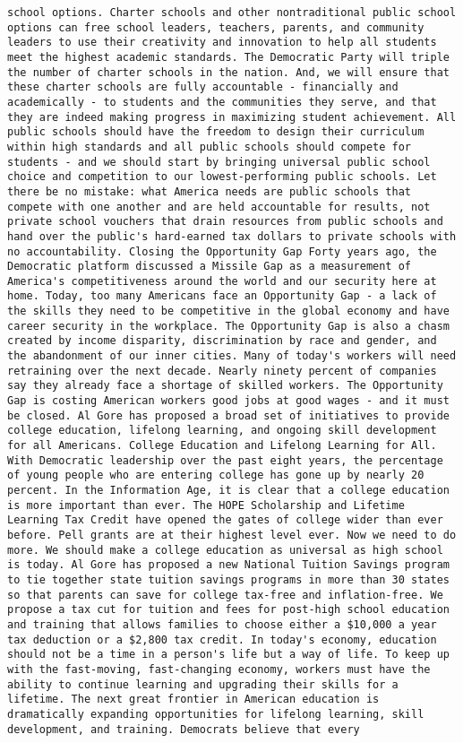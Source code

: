 \documentclass[
]{article}
\begin{document}
\begin{verbatim}
school options. Charter schools and other nontraditional public school options can free school leaders, teachers, parents, and community leaders to use their creativity and innovation to help all students meet the highest academic standards. The Democratic Party will triple the number of charter schools in the nation. And, we will ensure that these charter schools are fully accountable - financially and academically - to students and the communities they serve, and that they are indeed making progress in maximizing student achievement. All public schools should have the freedom to design their curriculum within high standards and all public schools should compete for students - and we should start by bringing universal public school choice and competition to our lowest-performing public schools. Let there be no mistake: what America needs are public schools that compete with one another and are held accountable for results, not private school vouchers that drain resources from public schools and hand over the public's hard-earned tax dollars to private schools with no accountability. Closing the Opportunity Gap Forty years ago, the Democratic platform discussed a Missile Gap as a measurement of America's competitiveness around the world and our security here at home. Today, too many Americans face an Opportunity Gap - a lack of the skills they need to be competitive in the global economy and have career security in the workplace. The Opportunity Gap is also a chasm created by income disparity, discrimination by race and gender, and the abandonment of our inner cities. Many of today's workers will need retraining over the next decade. Nearly ninety percent of companies say they already face a shortage of skilled workers. The Opportunity Gap is costing American workers good jobs at good wages - and it must be closed. Al Gore has proposed a broad set of initiatives to provide college education, lifelong learning, and ongoing skill development for all Americans. College Education and Lifelong Learning for All. With Democratic leadership over the past eight years, the percentage of young people who are entering college has gone up by nearly 20 percent. In the Information Age, it is clear that a college education is more important than ever. The HOPE Scholarship and Lifetime Learning Tax Credit have opened the gates of college wider than ever before. Pell grants are at their highest level ever. Now we need to do more. We should make a college education as universal as high school is today. Al Gore has proposed a new National Tuition Savings program to tie together state tuition savings programs in more than 30 states so that parents can save for college tax-free and inflation-free. We propose a tax cut for tuition and fees for post-high school education and training that allows families to choose either a $10,000 a year tax deduction or a $2,800 tax credit. In today's economy, education should not be a time in a person's life but a way of life. To keep up with the fast-moving, fast-changing economy, workers must have the ability to continue learning and upgrading their skills for a lifetime. The next great frontier in American education is dramatically expanding opportunities for lifelong learning, skill development, and training. Democrats believe that every 
\end{verbatim}
\end{document}
